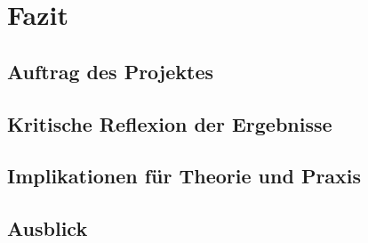 \chapter{Fazit}
\section{Auftrag des Projektes}
\section{Kritische Reflexion der Ergebnisse}
\section{Implikationen für Theorie und Praxis}
\section{Ausblick}

